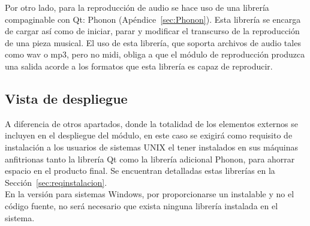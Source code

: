 Por otro lado, para la reproducción de audio se hace uso de una librería compaginable con Qt: Phonon (Apéndice~\ref{sec:Phonon}). Esta librería se encarga de cargar así como de iniciar, parar y modificar el transcurso de la reproducción de una pieza musical. El uso de esta librería, que soporta archivos de audio tales como wav o mp3, pero no midi, obliga a que el módulo de reproducción produzca una salida acorde a los formatos que esta librería es capaz de reproducir.

\subsection{Vista de despliegue}

A diferencia de otros apartados, donde la totalidad de los elementos externos se incluyen en el despliegue del módulo, en este caso se exigirá como requisito de instalación a los usuarios de sistemas UNIX el tener instalados en sus máquinas anfitrionas tanto la librería Qt como la librería adicional Phonon, para ahorrar espacio en el producto final. Se encuentran detalladas estas librerías en la Sección~\ref{sec:reqinstalacion}.\\

En la versión para sistemas Windows, por proporcionarse un instalable y no el código fuente, no será necesario que exista ninguna librería instalada en el sistema.\\